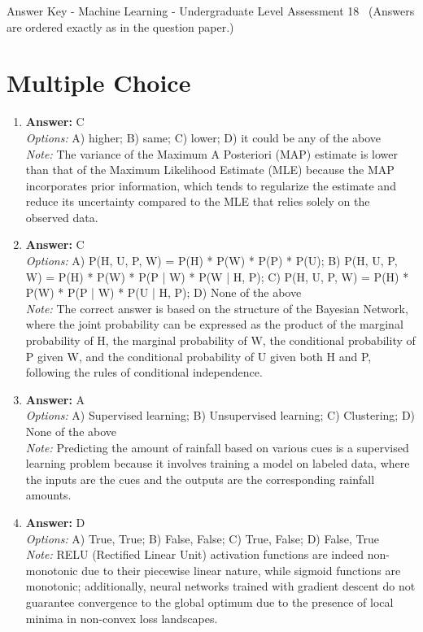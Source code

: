 \documentclass[12pt]{article}
\begin{document}
\begin{center}
Answer Key - Machine Learning - Undergraduate Level Assessment 18 \
\small (Answers are ordered exactly as in the question paper.)
\end{center}

\section*{Multiple Choice}
\begin{enumerate}[label=\arabic*.]
\item \textbf{Answer:} C
\\ \textit{Options:} A) higher; B) same; C) lower; D) it could be any of the above
\\ \textit{Note:} The variance of the Maximum A Posteriori (MAP) estimate is lower than that of the Maximum Likelihood Estimate (MLE) because the MAP incorporates prior information, which tends to regularize the estimate and reduce its uncertainty compared to the MLE that relies solely on the observed data.
\item \textbf{Answer:} C
\\ \textit{Options:} A) P(H, U, P, W) = P(H) * P(W) * P(P) * P(U); B) P(H, U, P, W) = P(H) * P(W) * P(P | W) * P(W | H, P); C) P(H, U, P, W) = P(H) * P(W) * P(P | W) * P(U | H, P); D) None of the above
\\ \textit{Note:} The correct answer is based on the structure of the Bayesian Network, where the joint probability can be expressed as the product of the marginal probability of H, the marginal probability of W, the conditional probability of P given W, and the conditional probability of U given both H and P, following the rules of conditional independence.
\item \textbf{Answer:} A
\\ \textit{Options:} A) Supervised learning; B) Unsupervised learning; C) Clustering; D) None of the above
\\ \textit{Note:} Predicting the amount of rainfall based on various cues is a supervised learning problem because it involves training a model on labeled data, where the inputs are the cues and the outputs are the corresponding rainfall amounts.
\item \textbf{Answer:} D
\\ \textit{Options:} A) True, True; B) False, False; C) True, False; D) False, True
\\ \textit{Note:} RELU (Rectified Linear Unit) activation functions are indeed non-monotonic due to their piecewise linear nature, while sigmoid functions are monotonic; additionally, neural networks trained with gradient descent do not guarantee convergence to the global optimum due to the presence of local minima in non-convex loss landscapes.

\end{enumerate}
\end{document}
